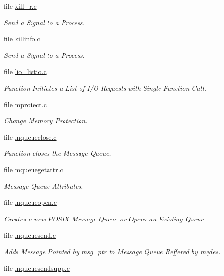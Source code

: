 \begin{DoxyCompactItemize}
file \mbox{\hyperlink{kill__r_8c}{kill\+\_\+r.\+c}}
\begin{DoxyCompactList}\small\item\em Send a Signal to a Process. \end{DoxyCompactList}\item 
file \mbox{\hyperlink{killinfo_8c}{killinfo.\+c}}
\begin{DoxyCompactList}\small\item\em Send a Signal to a Process. \end{DoxyCompactList}\item 
file \mbox{\hyperlink{lio__listio_8c}{lio\+\_\+listio.\+c}}
\begin{DoxyCompactList}\small\item\em Function Initiates a List of I/O Requests with Single Function Call. \end{DoxyCompactList}\item 
file \mbox{\hyperlink{mprotect_8c}{mprotect.\+c}}
\begin{DoxyCompactList}\small\item\em Change Memory Protection. \end{DoxyCompactList}\item 
file \mbox{\hyperlink{mqueueclose_8c}{mqueueclose.\+c}}
\begin{DoxyCompactList}\small\item\em Function closes the Message Queue. \end{DoxyCompactList}\item 
file \mbox{\hyperlink{mqueuegetattr_8c}{mqueuegetattr.\+c}}
\begin{DoxyCompactList}\small\item\em Message Queue Attributes. \end{DoxyCompactList}\item 
file \mbox{\hyperlink{mqueueopen_8c}{mqueueopen.\+c}}
\begin{DoxyCompactList}\small\item\em Creates a new P\+O\+S\+IX Message Queue or Opens an Existing Queue. \end{DoxyCompactList}\item 
file \mbox{\hyperlink{mqueuesend_8c}{mqueuesend.\+c}}
\begin{DoxyCompactList}\small\item\em Adds Message Pointed by msg\+\_\+ptr to Message Queue Reffered by mqdes. \end{DoxyCompactList}\item 
file \mbox{\hyperlink{mqueuesendsupp_8c}{mqueuesendsupp.\+c}}

\end{DoxyCompactItemize}
